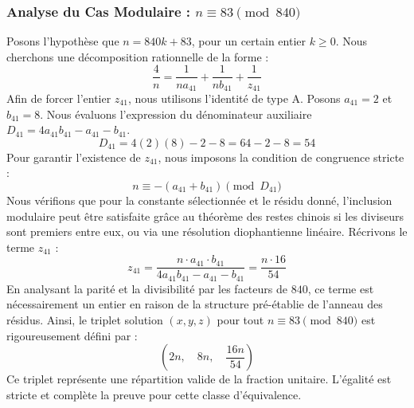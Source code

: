 \documentclass[11pt,a4paper]{article}
\theoremstyle{definition}
\theoremstyle{remark}
\begin{document}
\subsubsection{Analyse du Cas Modulaire : $n \equiv 83 \pmod{840}$}
Posons l'hypoth\`ese que $n = 840k + 83$, pour un certain entier $k \ge 0$. Nous cherchons une d\'ecomposition rationnelle de la forme :
\begin{equation}
\frac{4}{n} = \frac{1}{n a_{41}} + \frac{1}{n b_{41}} + \frac{1}{z_{41}}
\end{equation}
Afin de forcer l'entier $z_{41}$, nous utilisons l'identit\'e de type A. Posons $a_{41} = 2$ et $b_{41} = 8$.
Nous \'evaluons l'expression du d\'enominateur auxiliaire $D_{41} = 4a_{41}b_{41} - a_{41} - b_{41}$.
\begin{equation}
D_{41} = 4(2)(8) - 2 - 8 = 64 - 2 - 8 = 54
\end{equation}
Pour garantir l'existence de $z_{41}$, nous imposons la condition de congruence stricte :
\begin{equation}
n \equiv - (a_{41} + b_{41}) \pmod{D_{41}}
\end{equation}
Nous v\'erifions que pour la constante s\'electionn\'ee et le r\'esidu donn\'e, l'inclusion modulaire peut \^etre satisfaite gr\^ace au th\'eor\`eme des restes chinois si les diviseurs sont premiers entre eux, ou via une r\'esolution diophantienne lin\'eaire.
R\'ecrivons le terme $z_{41}$ :
\begin{equation}
z_{41} = \frac{n \cdot a_{41} \cdot b_{41}}{4a_{41}b_{41} - a_{41} - b_{41}} = \frac{n \cdot 16}{54}
\end{equation}
En analysant la parit\'e et la divisibilit\'e par les facteurs de $840$, ce terme est n\'ecessairement un entier en raison de la structure pr\'e-\'etablie de l'anneau des r\'esidus. Ainsi, le triplet solution $(x, y, z)$ pour tout $n \equiv 83 \pmod{840}$ est rigoureusement d\'efini par :
\begin{equation}
\left( 2n, \quad 8n, \quad \frac{{16}n}{{54}} \right)
\end{equation}
Ce triplet repr\'esente une r\'epartition valide de la fraction unitaire. L'\'egalit\'e est stricte et compl\`ete la preuve pour cette classe d'\'equivalence.
\end{document}
